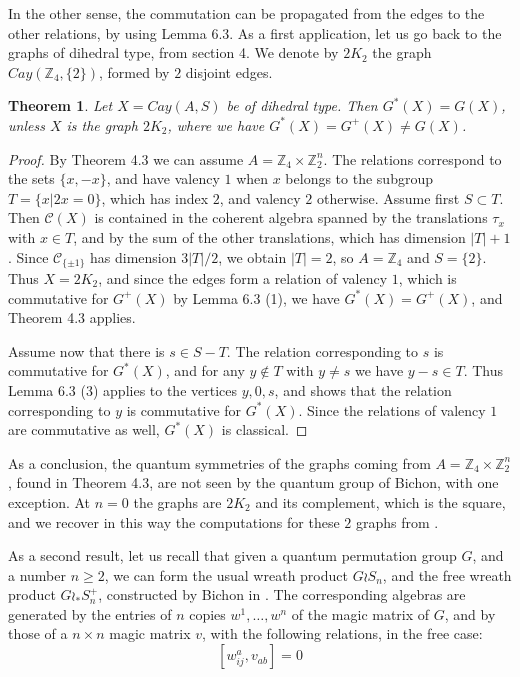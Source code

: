\documentclass[11pt]{amsart}
\newtheorem{theorem}{Theorem}[section]
\newcommand{\C}{\mathcal C}
\newcommand{\Z}{\mathbb Z}
\begin{document}
In the other sense, the commutation can be propagated from the edges to the other relations, by using Lemma 6.3. As a first application, let us go back to the graphs of dihedral type, from section 4. We denote by $2K_2$ the graph $Cay(\Z_4,\{2\})$, formed by $2$ disjoint edges.

\begin{theorem}
Let $X=Cay(A,S)$ be of dihedral type. Then $G^*(X)=G(X)$, unless $X$ is the graph $2K_2$, where we have $G^*(X)=G^+(X)\neq G(X)$.
\end{theorem}

\begin{proof}
By Theorem 4.3 we can assume $A=\Z_4\times\Z_2^n$. The relations correspond to the sets $\{x,-x\}$, and have valency $1$ when $x$ belongs to the subgroup $T=\{x|2x=0\}$, which has index $2$, and valency $2$ otherwise. Assume first $S\subset T$. Then $\C(X)$ is contained in the coherent algebra spanned by the translations $\tau_x$ with $x\in T$, and by the sum of the other translations, which has dimension $|T|+1$. Since $\C_{\{\pm1\}}$ has dimension $3|T|/2$, we obtain $|T|=2$, so $A=\Z_4$ and $S=\{2\}$. Thus $X=2K_2$, and since the edges form a relation of valency $1$, which is commutative for $G^+(X)$ by Lemma 6.3 (1), we have $G^*(X)=G^+(X)$, and Theorem 4.3 applies.

Assume now that there is $s\in S-T$. The relation corresponding to $s$ is commutative for $G^*(X)$, and for any $y\notin T$ with $y\neq s$ we have $y-s\in T$. Thus Lemma 6.3 (3) applies to the vertices $y,0,s$, and shows that the relation corresponding to $y$ is commutative for $G^*(X)$. Since the relations of valency $1$ are commutative as well, $G^*(X)$ is classical.
\end{proof}

As a conclusion, the quantum symmetries of the graphs coming from $A=\Z_4\times\Z_2^n$, found in Theorem 4.3, are not seen by the quantum group of Bichon, with one exception. At $n=0$ the graphs are $2K_2$ and its complement, which is the square, and we recover in this way the computations for these $2$ graphs from \cite{sw}.

As a second result, let us recall that given a quantum permutation group $G$, and a number $n\geq2$, we can form the usual wreath product $G\wr S_n$, and the free wreath product $G\wr_*S_n^+$, constructed by Bichon in \cite{bi2}. The corresponding algebras are generated by the entries of $n$ copies $w^1,\ldots,w^n$ of the magic matrix of $G$, and by those of a $n\times n$ magic matrix $v$, with the following relations, in the free case:
$$[w^a_{ij},v_{ab}]=0$$
\end{document}
